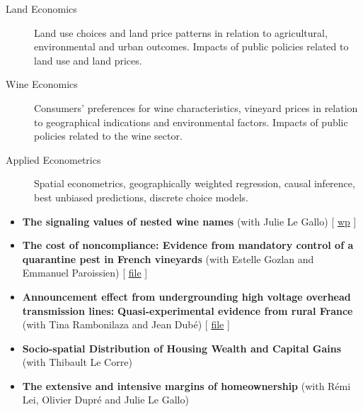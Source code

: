 \documentclass[11pt, a4paper]{./style}
\begin{document}
\label{sec:orgff34be5}

\begin{description}
\item[{Land Economics}] Land use choices and land price patterns in
relation to agricultural, environmental and urban
outcomes. Impacts of public policies related to land use and land
prices.
\item[{Wine Economics}] Consumers' preferences for wine characteristics,
vineyard prices in relation to geographical indications and
environmental factors. Impacts of public policies related to the
wine sector.
\item[{Applied Econometrics}] Spatial econometrics, geographically
weighted regression, causal inference, best unbiased predictions,
discrete choice models.
\end{description}

\label{sec:org2bd2080}

\begin{itemize}
\item \textbf{The signaling values of nested wine names} (with Julie Le
Gallo) [ \href{https://wine-economics.org/wp-content/uploads/2021/05/AAWE\_WP265.pdf}{wp} ]
\item \textbf{The cost of noncompliance: Evidence from mandatory control of a
quarantine pest in French vineyards} (with Estelle Gozlan and
Emmanuel Paroissien) [ \href{doc/RISCA-FILE.pdf}{file} ]
\item \textbf{Announcement effect from undergrounding high voltage overhead
transmission lines:} \textbf{Quasi-experimental evidence from rural
France} (with Tina Rambonilaza and Jean Dubé) [ \href{doc/HVTOL-FILE.pdf}{file} ]
\item \textbf{Socio-spatial Distribution of Housing Wealth and Capital Gains}
(with Thibault Le Corre)
\item \textbf{The extensive and intensive margins of homeownership} (with Rémi
Lei, Olivier Dupré and Julie Le Gallo)
\end{itemize}

\label{sec:orge3a2b4b}
\label{sec:org919a0fa}
\end{document}
